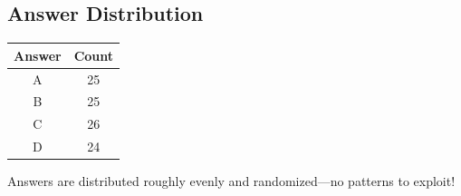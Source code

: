 \documentclass[12pt,a4paper]{article}
\begin{document}
\subsection*{Answer Distribution}
\begin{tabular}{|c|c|}
\hline
\textbf{Answer} & \textbf{Count} \\
\hline
A & 25 \\
B & 25 \\
C & 26 \\
D & 24 \\
\hline
\end{tabular}

\vspace{0.5cm}
Answers are distributed roughly evenly and randomized---no patterns to exploit!
\end{document}
